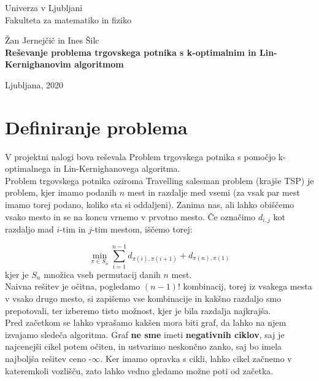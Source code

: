 \documentclass[12pt, a4paper]{article}
\begin{document}
\begin{titlepage}
\begin{center}

\large
Univerza v Ljubljani\\
\normalsize
Fakulteta za matematiko in fiziko\\

\vspace{3 cm} 

\large
Žan Jernejčič in Ines Šilc\\

\vspace{0.5cm}
\LARGE
\textbf{Reševanje problema trgovskega potnika s k-optimalnim in
Lin-Kernighanovim algoritmom}

\vfill

\large Ljubljana, 2020

\end{center}
\end{titlepage}

\newpage

\section[Definiranje problema]{Definiranje problema}

V projektni nalogi bova reševala Problem trgovskega potnika s pomočjo k-optimalnega in Lin-Kernighanovega algoritma.\\

Problem trgovskega potnika oziroma Travelling salesman problem (krajše TSP) je problem, kjer imamo podanih $n$ mest in razdalje med vsemi (za vsak par mest imamo torej podano, koliko sta si oddaljeni). Zanima nas, ali lahko obiščemo vsako mesto in se na koncu vrnemo v prvotno mesto. Če označimo $d_{i, j}$ kot razdaljo mad $i$-tim in $j$-tim mestom, iščemo torej:

$$
\min_{\pi \in S_n} \sum\limits_{i=1}^{n-1} d_{\pi (i), \pi (i+1)} + d_{\pi (n), \pi (1)}
$$
 kjer je $S_n$ množica vseh permutacij danih $n$ mest. \\
 
Naivna rešitev je očitna, pogledamo $(n-1)!$ kombinacij, torej iz vsakega mesta v vsako drugo mesto, si zapišemo vse kombinacije in kakšno razdaljo smo prepotovali, ter izberemo tisto možnost, kjer je bila razdalja najkrajša.\\ 

Pred začetkom se lahko vprašamo kakšen mora biti graf, da lahko na njem izvajamo sledeča algoritma. Graf \textbf{ne sme} imeti \textbf{negativnih ciklov}, saj je najcenejši cikel potem očiten, in ustvarimo neskončno zanko, saj bo imela najboljša rešitev ceno -$\infty$. Ker imamo opravka s cikli, lahko cikel začnemo v kateremkoli vozlišču, zato lahko vedno gledamo možne poti od začetka.\\
\end{document}
